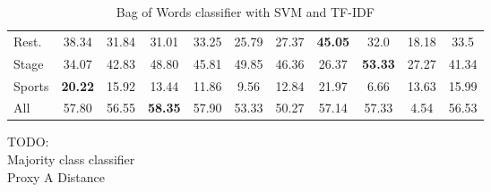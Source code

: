 \begin{table}[]
{\begin{tabular}{@{}lcccccccccc@{}}
		\multicolumn{1}{l|}{Rest.}      & 38.34                      & 31.84                     & 31.01                     & 33.25                          & 25.79                        & 27.37                     & \textbf{45.05}             & 32.0                      & 18.18                      & 33.5                   \\
		\multicolumn{1}{l|}{Stage}      & 34.07                       & 42.83                     & 48.80                    & 45.81                          & 49.85                        & 46.36                     & 26.37                     & \textbf{53.33}            & 27.27                      & 41.34                   \\
		\multicolumn{1}{l|}{Sports}     & \textbf{20.22}                      & 15.92                      & 13.44                    & 11.86                          & 9.56                        & 12.84                     & 21.97                      & 6.66                     & 13.63             & 15.99                    \\
		\multicolumn{1}{l|}{All}        & 57.80                      & 56.55                     & \textbf{58.35}            & 57.90                          & 53.33                        & 50.27                     & 57.14                     & 57.33                     & 4.54                      & 56.53                       
	\end{tabular}%
}
	\caption{Bag of Words classifier with SVM and TF-IDF}
	\label{tab:bow}
\end{table}


TODO:\\
Majority class classifier\\
Proxy A Distance\\
